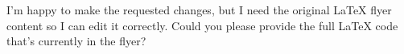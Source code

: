 I’m happy to make the requested changes, but I need the original LaTeX flyer content so I can edit it correctly. Could you please provide the full LaTeX code that’s currently in the flyer?